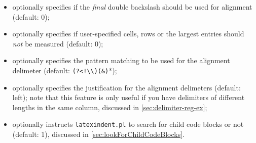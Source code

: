 \begin{itemize}
{        alignment}\texttt{justification}: optionally specifies the justification of each cell as
        either \emph{left} or \emph{right} (default: left);
  \item {}
        optionally specifies if the \emph{final} double backslash should be used for alignment
        (default: 0);
  \item {} optionally specifies if
        user-specified cells, rows or the largest entries should \emph{not} be measured (default:
        0);
  \item {} optionally specifies the
        pattern matching to be used for the alignment delimeter (default:
        \lstinline* '(?<!\\)(&)'*);
  \item {} optionally
        specifies the justification for the alignment delimeters (default: left); note that this
        feature is only useful if you have delimiters of different lengths in the same column,
        discussed in \cref{sec:delimiter-reg-ex};
  \item {} optionally
        instructs \texttt{latexindent.pl} to search for child code blocks or not (default: 1),
        discussed in \cref{sec:lookForChildCodeBlocks}.
 \end{itemize}

